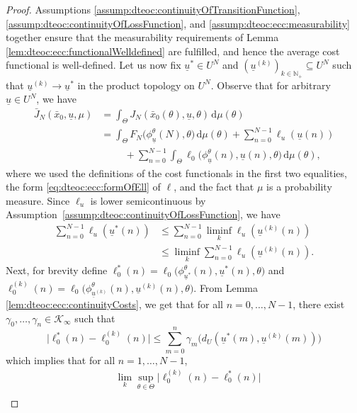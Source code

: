 \documentclass[10pt,a4paper]{amsart}
\newcommand{\Np}{\mathbb{N}_+} %
\newcommand{\cKi}{\mathcal{K}_\infty} %
\newcommand{\diff}{\, \mathrm{d}} %
\newcommand{\es}{\bar{x}} %
\newcommand{\is}[1]{{\underline{#1}}} %
\newcommand{\s}{\phi} %
\begin{document}
\begin{proof}
Assumptions  \ref{assump:dteoc:continuityOfTransitionFunction}, \ref{assump:dteoc:continuityOfLossFunction}, and \ref{assump:dteoc:ecc:measurability} together ensure that the measurability requirements of Lemma \ref{lem:dteoc:ecc:functionalWelldefined} are fulfilled, and hence the average cost functional is well-defined.
Let us now fix $\is{u}^\ast \in U^N$ and $(\is{u}^{(k)})_{k\in\Np} \subseteq U^N$ such that $\is{u}^{(k)}\rightarrow \is{u}^\ast$ in the product topology on $U^N$.
Observe that for arbitrary $\is{u}\in U^N$, we have
\begin{align*}
    \bar J_N(\es_0,\is{u},\mu) & = \int_{\Theta} J_N(\es_0(\theta),\is{u},\theta) \diff \mu(\theta) \\
    & = \int_\Theta F_N\big( \s_{\is{u}}^\theta(N), \theta \big) \diff \mu(\theta) 
        + \sum_{n=0}^{N-1} \ell_u(\is{u}(n)) \\
        & \hspace{1cm} + \sum_{n=0}^{N-1} \int_\Theta \ell_0 \big( \s_{\is{u}}^\theta(n), \is{u}(n), \theta \big) \diff \mu(\theta),
\end{align*}
where we used the definitions of the cost functionals in the first two equalities,
the form \eqref{eq:dteoc:ecc:formOfEll} of $\ell$, and the fact that $\mu$ is a probability measure.
Since $\ell_u$ is lower semicontinuous by Assumption~\ref{assump:dteoc:continuityOfLossFunction}, we have 
\begin{align*}
    \sum_{n=0}^{N-1} \ell_u(\is{u}^\ast(n)) & \leq \sum_{n=0}^{N-1} \liminf_{k} \ell_u(\is{u}^{(k)}(n)) \\
        & \leq \liminf_{k} \sum_{n=0}^{N-1} \ell_u(\is{u}^{(k)}(n)).
\end{align*}
Next, for brevity define $\ell_0^\ast(n) =  \ell_0 \big( \s_{\is{u}^\ast}^\theta(n), \is{u}^\ast(n), \theta \big)$ and $\ell_0^{(k)}(n) =  \ell_0 \big( \s_{\is{u}^{(k)}}^\theta(n), \is{u}^{(k)}(n), \theta \big) $.
From Lemma \ref{lem:dteoc:ecc:continuityCosts}, we get that for all $n=0,\ldots,N-1$, there exist $\gamma_0,\ldots,\gamma_{n}\in\cKi$ such that
\begin{equation*}
    \big| \ell_0^\ast(n) - \ell_0^{(k)}(n) \big| \leq \sum_{m=0}^{n} \gamma_m \big(d_U(\is{u}^\ast(m),\is{u}^{(k)}(m)) \big)
\end{equation*}
which implies that for all $n=1,\ldots,N-1$,
\begin{align*}
    & \lim_{k} \sup_{\theta\in\Theta} 
        \Big| \ell_0^{(k)}(n)  - \ell_0^\ast(n) \Big|
     \\

\end{align*}
\end{proof}
\end{document}
